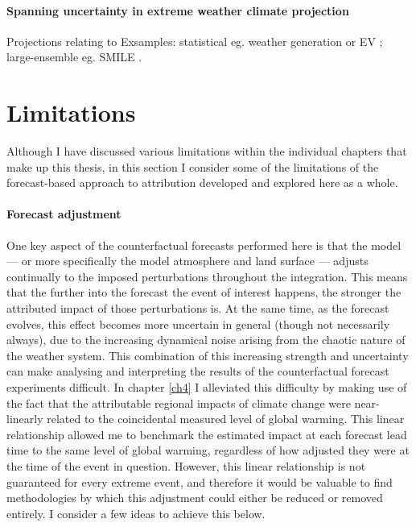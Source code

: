   \paragraph*{Spanning uncertainty in extreme weather climate projection}



  Projections relating to Exsamples: statistical eg. weather generation or EV \citep{brown_climate_2014}; large-ensemble eg. SMILE \citep{maher_large_2021}.

\section{Limitations}

  Although I have discussed various limitations within the individual chapters that make up this thesis, in this section I consider some of the limitations of the forecast-based approach to attribution developed and explored here as a whole.

  \paragraph*{Forecast adjustment}

    One key aspect of the counterfactual forecasts performed here is that the model --- or more specifically the model atmosphere and land surface --- adjusts continually to the imposed perturbations throughout the integration. This means that the further into the forecast the event of interest happens, the stronger the attributed impact of those perturbations is. At the same time, as the forecast evolves, this effect becomes more uncertain in general (though not necessarily always), due to the increasing dynamical noise arising from the chaotic nature of the weather system. This combination of this increasing strength and uncertainty can make analysing and interpreting the results of the counterfactual forecast experiments difficult. In chapter \ref{ch4} I alleviated this difficulty by making use of the fact that the attributable regional impacts of climate change were near-linearly related to the coincidental measured level of global warming. This linear relationship allowed me to benchmark the estimated impact at each forecast lead time to the same level of global warming, regardless of how adjusted they were at the time of the event in question. However, this linear relationship is not guaranteed for every extreme event, and therefore it would be valuable to find methodologies by which this adjustment could either be reduced or removed entirely. I consider a few ideas to achieve this below.


